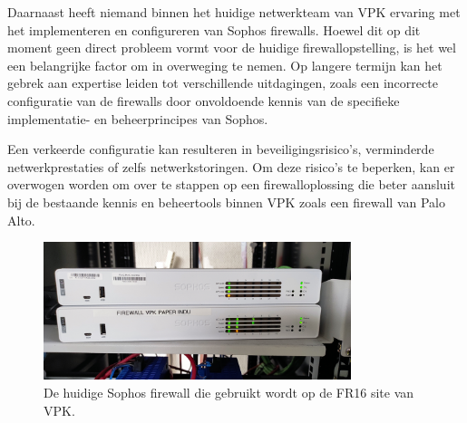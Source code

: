 Daarnaast heeft niemand binnen het huidige netwerkteam van VPK ervaring met het implementeren en configureren van Sophos firewalls. Hoewel dit op dit moment geen direct probleem vormt voor de huidige firewallopstelling, is het wel een belangrijke factor om in overweging te nemen. Op langere termijn kan het gebrek aan expertise leiden tot verschillende uitdagingen, zoals een incorrecte configuratie van de firewalls door onvoldoende kennis van de specifieke implementatie- en beheerprincipes van Sophos.

Een verkeerde configuratie kan resulteren in beveiligingsrisico’s, verminderde netwerkprestaties of zelfs netwerkstoringen. Om deze risico’s te beperken, kan er overwogen worden om over te stappen op een firewalloplossing die beter aansluit bij de bestaande kennis en beheertools binnen VPK zoals een firewall van Palo Alto.

\begin{figure}[H]
    \centering
    \includegraphics[width=0.8\textwidth]{fotos/SophosFirewall.jpg}
    \caption[Sophos Firewall]{\label{fig:grail}De huidige Sophos firewall die gebruikt wordt op de FR16 site van VPK.}
\end{figure} 

